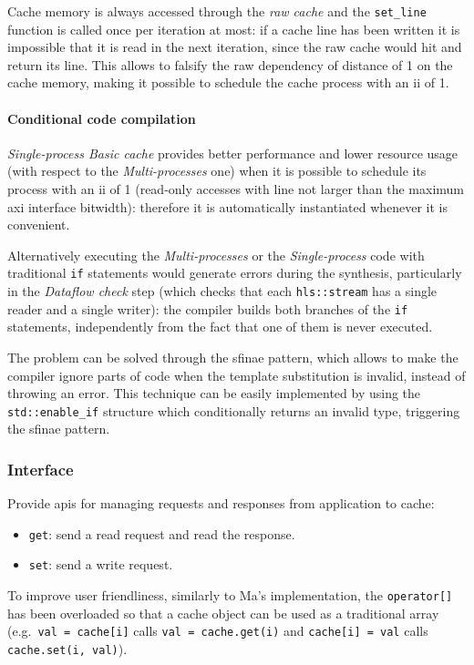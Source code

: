 \documentclass[11pt,a4paper,oneside]{memoir}
\begin{document}
Cache memory is always accessed through the \emph{\ac{raw} cache} and the
\texttt{set\_line} function is called once per iteration at most: if a cache
line has been written it is impossible that it is read in the next iteration,
since the \ac{raw} cache would hit and return its line. This allows to falsify
the \ac{raw} dependency of distance of 1 on the cache memory, making it
possible to schedule the cache process with an \ac{ii} of 1.

\paragraph{Conditional code compilation}
\emph{Single-process Basic cache} provides better performance and lower
resource usage (with respect to the \emph{Multi-processes} one) when it is
possible to schedule its process with an \ac{ii} of 1 (read-only accesses with
line not larger than the maximum \ac{axi} interface bitwidth): therefore it is
automatically instantiated whenever it is convenient.

Alternatively executing the \emph{Multi-processes} or the \emph{Single-process}
code with traditional \texttt{if} statements would generate errors during the
synthesis, particularly in the \emph{Dataflow check} step (which checks that
each \texttt{hls::stream} has a single reader and a single writer): the
compiler builds both branches of the \texttt{if} statements, independently from
the fact that one of them is never executed.

The problem can be solved through the \ac{sfinae} pattern, which allows to make
the compiler ignore parts of code when the template substitution is invalid,
instead of throwing an error.
This technique can be easily implemented by using the \texttt{std::enable\_if}
structure which conditionally returns an invalid type, triggering the
\ac{sfinae} pattern.

\subsubsection{Interface}
Provide \acsp{api} for managing requests and responses from application to
cache:
\begin{itemize}
	\item \texttt{get}: send a read request and read the response.
	\item \texttt{set}: send a write request.
\end{itemize}
To improve user friendliness, similarly to Ma's implementation, the
\texttt{operator[]} has been overloaded so that a cache object can be used as a
traditional array (e.g.\ \texttt{val~=~cache[i]} calls
\texttt{val~=~cache.get(i)} and \texttt{cache[i]~=~val} calls
\texttt{cache.set(i,~val)}).
\end{document}
